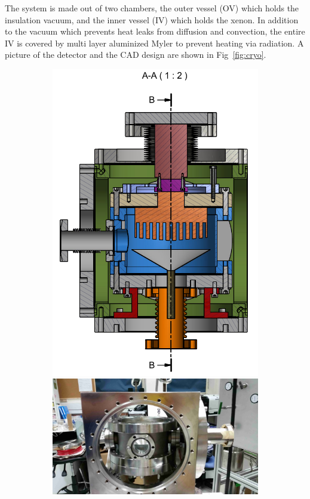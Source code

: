 The system is made out of two chambers, the outer vessel (OV) which holds the insulation vacuum, and the inner vessel (IV) which holds the xenon. In addition to the vacuum which prevents heat leaks from diffusion and convection, the entire IV is covered by multi layer aluminized Myler to prevent heating via radiation. A picture of the detector and the CAD design are shown in Fig~\ref{fig:cryo}. 
\begin{figure}
   \centering
    \begin{subfigure}[b]{0.25\textheight}
    \includegraphics[width=\textwidth]{cryogenic1.png}
    \includegraphics[width=\textwidth]{CryoOpen_small.jpg}

\end{subfigure}
\end{figure}

